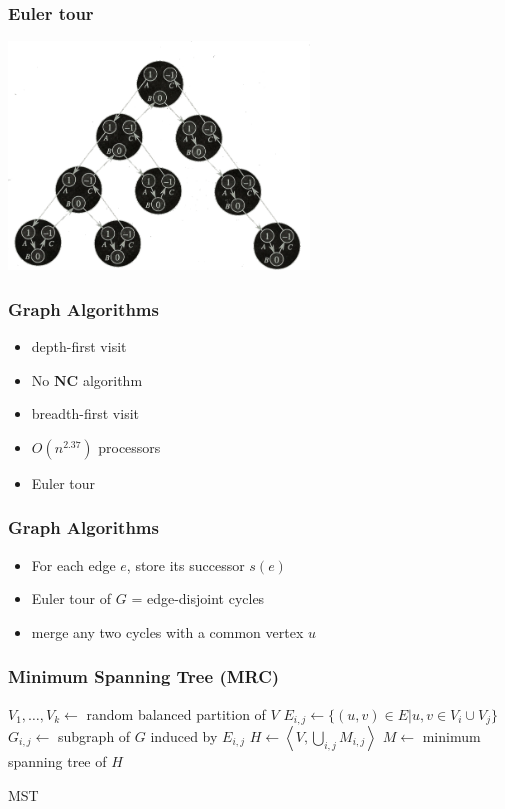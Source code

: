 \documentclass[14pt]{beamer}
\begin{document}
\begin{frame}\frametitle{Euler tour}
  \begin{center}
    \includegraphics[width=8cm]{euler1.png}
  \end{center}

\end{frame}

\begin{frame}\frametitle{Graph Algorithms}
  \begin{itemize}
  \item
    depth-first visit
  \item
    No $\mathbf{NC}$ algorithm
  \item
    breadth-first visit
  \item
    $O(n^{2.37})$ processors
  \item
    \alert{Euler tour}
  \end{itemize}
\end{frame}

\begin{frame}\frametitle{Graph Algorithms}
  \begin{itemize}
  \item
    For each edge $e$, store its successor $s(e)$
  \item
    Euler tour of $G$ = edge-disjoint cycles
  \item
    merge any two cycles with a common vertex $u$
  \end{itemize}
\end{frame}

\begin{frame}\frametitle{Minimum Spanning Tree (MRC)}
  \begin{algorithm}[H]

    $V_{1}, \ldots, V_{k} \gets $ random balanced partition of $V$\;
    $E_{i,j} \gets \{(u, v) \in E | u, v \in V_{i} \cup V_{j} \}$\;
    $G_{i,j} \gets $ subgraph of $G$ induced by $E_{i,j}$\;
    $H \gets \left\langle V, \bigcup_{i,j} M_{i,j}\right\rangle $\;
    $M \gets$ minimum spanning tree of $H$\;
    \label{alg:MRC-MST}
    \caption{MST}
  \end{algorithm}
\end{frame}
\end{document}
